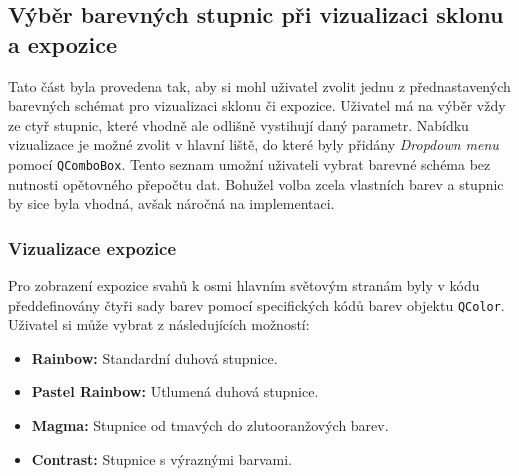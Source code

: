 \documentclass[12pt, a4paper]{article}
\begin{document}
\subsection{Výběr barevných stupnic při vizualizaci sklonu a expozice}
Tato část byla provedena tak, aby si mohl uživatel zvolit jednu z přednastavených barevných schémat pro vizualizaci sklonu či expozice. Uživatel má na výběr vždy ze ctyř stupnic, které vhodně ale odlišně vystihují daný parametr. Nabídku vizualizace je možné zvolit v hlavní liště, do které byly přidány \textit{Dropdown menu} pomocí \texttt{QComboBox}. Tento seznam umožní uživateli vybrat barevné schéma bez nutnosti opětovného přepočtu dat. Bohužel volba zcela vlastních barev a stupnic by sice byla vhodná, avšak náročná na implementaci. 
\subsubsection{Vizualizace expozice}
Pro zobrazení expozice svahů k osmi hlavním světovým stranám byly v kódu předdefinovány čtyři sady barev pomocí specifických kódů barev objektu \texttt{QColor}. Uživatel si může vybrat z následujících možností:

\begin{itemize}
    \item \textbf{Rainbow:} Standardní duhová stupnice.
    \item \textbf{Pastel Rainbow:} Utlumená duhová stupnice.
    \item \textbf{Magma:} Stupnice od tmavých do zlutooranžových barev.
    \item \textbf{Contrast:} Stupnice s výraznými barvami.
\end{itemize}
\end{document}
